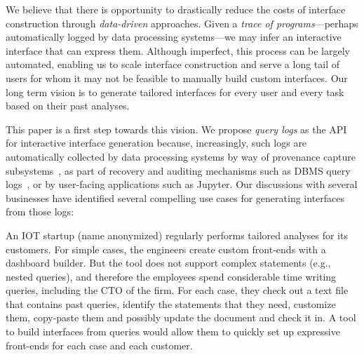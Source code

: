 We believe that there is opportunity to drastically reduce the costs of interface construction through {\it data-driven} approaches.
Given a {\it trace of programs}---perhaps automatically logged by data processing systems---we may infer an interactive interface that can express them.
Although imperfect, this process can be largely automated, enabling us to scale interface construction and serve a long tail of users for whom it may not be feasible to manually build custom interfaces.
Our long term vision is to generate tailored interfaces for every user and every task based on their past analyses.


This paper is a first step towards this vision.  We propose {\it query logs} as the API for interactive interface generation because, increasingly, such logs are automatically collected by data processing systems by way of provenance capture subsystems~\cite{ground,scheidegger2008tackling}, as part of recovery and auditing mechanisms such as DBMS query logs~\cite{malviya2014rethinking}, or by user-facing applications such as Jupyter.
 Our discussions with several businesses have identified several compelling use cases for generating interfaces from those logs:


 An IOT startup (name anonymized) regularly performs tailored analyses for its customers. For simple cases, the engineers create custom front-ends with a dashboard builder. But the tool does not support complex statements (e.g., nested queries), and therefore the employees spend considerable time writing queries, including the CTO of the firm. For each case, they check out a text file that contains past queries, identify the statements that they need, customize them, copy-paste them and possibly update the document and check it in. A tool to build interfaces from queries would allow them to quickly set up expressive front-ends for each case and each customer.

